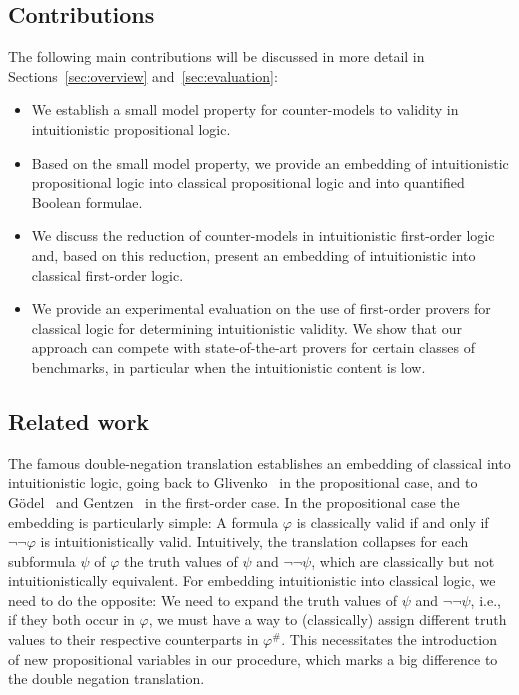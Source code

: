 \documentclass{easychair}
\theoremstyle{definition}
\theoremstyle{definition}
\theoremstyle{definition}
\theoremstyle{definition}
\theoremstyle{definition}
\theoremstyle{definition}
\theoremstyle{definition}
\begin{document}
\subsection*{Contributions}
The following main contributions will be discussed in more detail in Sections~\ref{sec:overview} and~\ref{sec:evaluation}:
\begin{itemize}\addtolength{\itemsep}{-5pt}
	\item We establish a small model property for counter-models to validity in intuitionistic propositional logic.
	\item Based on the small model property, we provide an embedding of intuitionistic propositional logic into classical propositional logic and into quantified Boolean formulae.
	\item We discuss the reduction of counter-models in intuitionistic first-order logic and, based on this reduction, present an embedding of intuitionistic into classical first-order logic.
	\item We provide an experimental evaluation on the use of first-order provers for classical logic for determining intuitionistic validity.
 We show that our approach can compete with state-of-the-art provers for certain classes of benchmarks, in particular when the intuitionistic content is low.
\end{itemize}

\subsection*{Related work}
The famous double-negation translation establishes
an embedding of classical into intuitionistic logic, going back to Glivenko~\cite{glivenko1929quelques} in the propositional case, and to Gödel~\cite{godel1933intuitionistischen} and Gentzen~\cite{gentzen1936widerspruchsfreiheit} in the first-order case.
In the propositional case the embedding is particularly simple:
A formula $\varphi$ is classically valid if and only if $\neg\neg\varphi$ is intuitionistically valid.
Intuitively, the translation collapses for each subformula $\psi$ of $\varphi$ the truth values of $\psi$ and $\neg\neg\psi$, which are classically but not intuitionistically equivalent.
For embedding intuitionistic into classical logic, we need to do the opposite:
We need to expand the truth values of $\psi$ and $\neg\neg\psi$, i.e., if they both occur in $\varphi$, we must have a way to (classically) assign different truth values to their respective counterparts in $\varphi^\#$.
This necessitates the introduction of new propositional variables in our procedure, which marks a big difference to the double negation translation.
\end{document}
